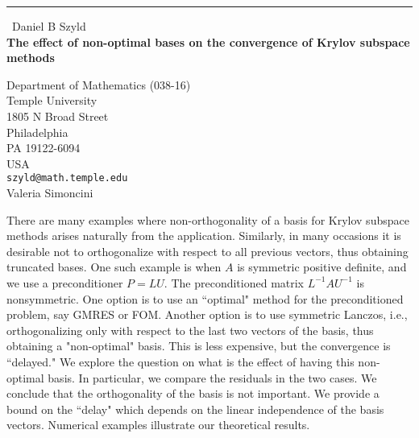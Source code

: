\documentclass{report}
\begin{document}
\begin{center}
\rule{6in}{1pt} \
{\large Daniel B Szyld \\
{\bf The effect of non-optimal bases on the convergence of Krylov subspace methods}}

Department of Mathematics (038-16) \\ Temple University \\ 1805 N Broad Street \\ Philadelphia \\ PA 19122-6094 \\ USA
\\
{\tt szyld@math.temple.edu}\\
Valeria Simoncini\end{center}

There are many examples where non-orthogonality of a basis
for Krylov subspace methods arises naturally from the
application. Similarly, in many occasions it is desirable
not to orthogonalize with respect to all previous vectors,
thus obtaining truncated bases.
One such example is when $A$ is symmetric positive definite,
and we use a preconditioner $P=LU$. The preconditioned matrix
$L^{-1} A U^{-1}$ is nonsymmetric. One option is to use
an ``optimal" method for the preconditioned problem, say
GMRES or FOM. Another option is to use symmetric Lanczos,
i.e., orthogonalizing only with respect to the last two vectors
of the basis, thus obtaining a "non-optimal" basis.
This is less expensive, but the convergence is ``delayed."
We explore the question on what is the effect of having this
non-optimal basis. In particular, we compare the
residuals in the two cases. We conclude that the orthogonality
of the basis is not important.
We provide a bound on the ``delay" which depends on the
linear independence of the basis vectors.
Numerical examples illustrate our theoretical results.
\end{document}
